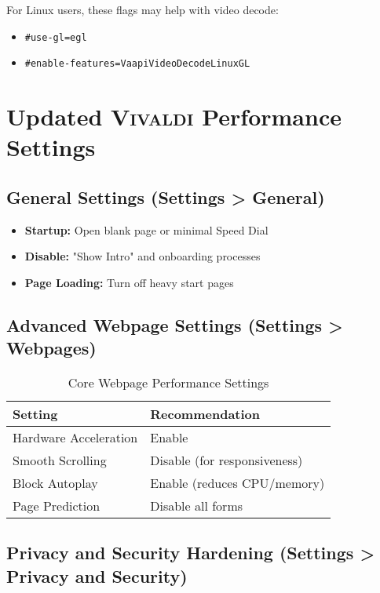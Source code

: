 \documentclass[11pt,a4paper,oneside]{book}
\newcommand{\vivaldi}{\textsc{Vivaldi}}
\newcommand{\menupath}[1]{\textbf{\color{darkgray}#1}}
\newcommand{\flag}[1]{\texttt{\color{accentorange}\#{}#1}}
\begin{document}
For Linux users, these flags may help with video decode:

\begin{itemize}
    \item \flag{use-gl=egl}
    \item \flag{enable-features=VaapiVideoDecodeLinuxGL}
\end{itemize}

\section{Updated \vivaldi{} Performance Settings}

\subsection{General Settings (\menupath{Settings > General})}

\begin{itemize}
    \item \textbf{Startup:} Open blank page or minimal Speed Dial
    \item \textbf{Disable:} "Show Intro" and onboarding processes
    \item \textbf{Page Loading:} Turn off heavy start pages
\end{itemize}

\subsection{Advanced Webpage Settings (\menupath{Settings > Webpages})}

\begin{table}[h]
\centering
\begin{tabular}{@{}ll@{}}
\toprule
\textbf{Setting} & \textbf{Recommendation} \\
\midrule
Hardware Acceleration & Enable \\
Smooth Scrolling & Disable (for responsiveness) \\
Block Autoplay & Enable (reduces CPU/memory) \\
Page Prediction & Disable all forms \\
\bottomrule
\end{tabular}
\caption{Core Webpage Performance Settings}
\end{table}

\subsection{Privacy and Security Hardening (\menupath{Settings > Privacy and Security})}
\end{document}
